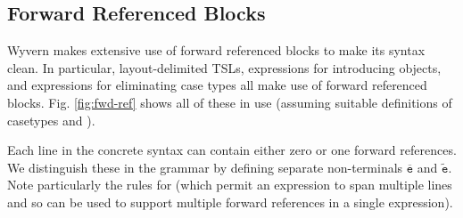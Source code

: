 \subsection{Forward Referenced Blocks}
Wyvern makes extensive use of forward referenced blocks to make its syntax clean. In particular, layout-delimited TSLs,  expressions for introducing objects, and  expressions for eliminating case types all make use of forward referenced blocks. Fig. \ref{fig:fwd-ref} shows all of these in use (assuming suitable definitions of casetypes  and ). 

Each line in the concrete syntax can contain either zero or one forward references. We distinguish these in the grammar by defining separate non-terminals $\overline{\texttt{e}}$ and $\widetilde{\texttt{e}}$. Note particularly the rules for  (which permit an expression to span multiple lines and so can be used to support multiple forward references in a single expression).

